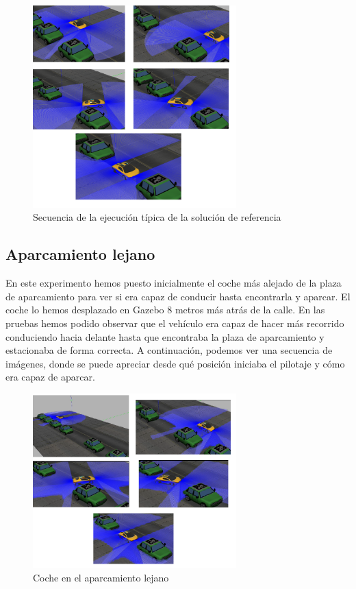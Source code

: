 \begin{figure}[H]
  \begin{center}
    \includegraphics[width=0.7\textwidth]{figures/Autopark/AparcamientoSecuencia.png}
		\caption{Secuencia de la ejecución típica de la solución de referencia}
		\label{fig.AparcamientoSecuencia}
		\end{center}
\end{figure}



\subsection{Aparcamiento lejano}

En este experimento hemos puesto inicialmente el coche más alejado de la plaza de aparcamiento para ver si era capaz de conducir hasta encontrarla y aparcar. El coche lo hemos desplazado en Gazebo 8 metros más atrás de la calle. En las pruebas hemos podido observar que el vehículo era capaz de hacer más recorrido conduciendo hacia delante hasta que encontraba la plaza de aparcamiento y estacionaba de forma correcta. A continuación, podemos ver una secuencia de imágenes, donde se puede apreciar desde qué posición iniciaba el pilotaje y cómo era capaz de aparcar.

\begin{figure}[H]
  \begin{center}
    \includegraphics[width=0.7\textwidth]{figures/Autopark/Experimento1.png}
		\caption{Coche en el aparcamiento lejano}
		\label{fig.Experimento1}
		\end{center}
\end{figure}


